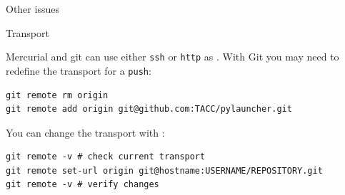  {Other issues}

 {Transport}

Mercurial and git can use either \texttt{ssh} or \texttt{http} as
%
%
.
With Git you may need to redefine the transport for a \texttt{push}:
\begin{verbatim}
git remote rm origin
git remote add origin git@github.com:TACC/pylauncher.git
\end{verbatim}

You can change the transport with :
\begin{lstlisting}[language=shell]
git remote -v # check current transport
git remote set-url origin git@hostname:USERNAME/REPOSITORY.git
git remote -v # verify changes
\end{lstlisting}

\endinput

$ git config --global user.name "Vlad Dracula"
$ git config --global user.email "vlad@tran.sylvan.ia"

git config --global init.defaultBranch main



